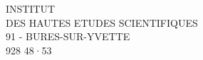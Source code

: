 \begin{center}
INSTITUT\\
DES HAUTES ETUDES SCIENTIFIQUES\\
91 - BURES-SUR-YVETTE\\
928 48·53
\end{center}
